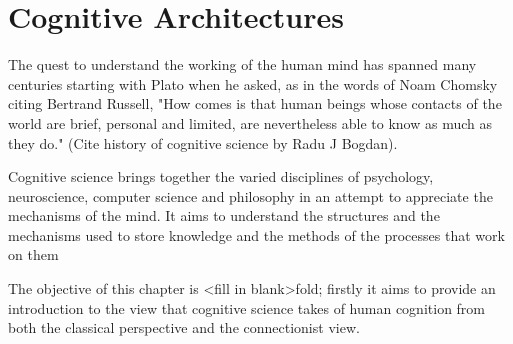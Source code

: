 \chapter{Cognitive Architectures}
\label{chap-two}

The quest to understand the working of the human mind has spanned
many centuries starting with Plato when he asked, as in the words of
Noam Chomsky citing Bertrand Russell, "How comes is that human beings
whose contacts of the world are brief, personal and limited, are
nevertheless able to know as much as they do." (Cite history of
cognitive science by Radu J Bogdan). 

Cognitive science brings together the varied disciplines of
psychology, neuroscience, computer science and philosophy in an
attempt to appreciate the mechanisms of the mind.
It aims to understand the structures and the mechanisms
used to store knowledge and the methods of the processes that work on
them

The objective of this chapter is <fill in blank>fold; firstly it aims
to provide an introduction to the view that cognitive science takes of
human cognition from both the classical perspective and the
connectionist view. 










